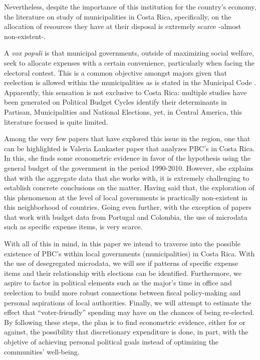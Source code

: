 Nevertheless, despite the importance of this institution for the country's economy, the literature on  study of municipalities in Costa Rica, specifically, on the allocation of  resources they have at their disposal is extremely scarce -almost non-existent-. 

A \textit{vox populi} is that municipal governments, outside of maximizing social welfare, seek to allocate expenses with a certain convenience, particularly when facing the electoral contest. This is a common objective amongst majors given that reelection is allowed within the municipalities as is stated in the Municipal Code \parencite[Art. 14]{al1998}. Apparently, this sensation is not exclusive to Costa Rica: multiple studies have been generated on Political Budget Cycles identify their determinants in Partisan, Municipalities and National Elections, yet, in Central America, this literature focused is quite limited.



 Among the very few papers that have explored this issue in the region, one that can be highlighted is Valeria Lankaster paper that analyzes PBC’s in Costa Rica. In this, she finds some econometric evidence in favor of the hypothesis using the general budget of the government in the period 1990-2010. However, she explains that with the aggregate data that she works with, it is extremely challenging to establish concrete conclusions on the matter. Having said that, the exploration of this phenomenon at the level of local governments is practically non-existent in this neighborhood of countries. Going even further, with the exception of papers that work with budget data from Portugal and Colombia, the use of microdata such as specific expense items, is very scarce. 

With all of this in mind, in this paper we intend to traverse into the possible existence of PBC’s within local governments (municipalities) in Costa Rica. With the use of desegregated microdata, we will see if patterns of specific expense items and their relationship with elections can be identified. Furthermore, we aspire to factor in political elements such as the major’s time in office and reelection to build more robust connections between fiscal policy-making and personal aspirations of local authorities. Finally, we will attempt to estimate the effect that “voter-friendly” spending may have on the chances of being re-elected. By following these steps, the plan is to find econometric evidence, either for or against, the possibility that discretionary expenditure is done, in part, with the objetive of achieving personal political goals instead of optimizing the communities’ well-being.


